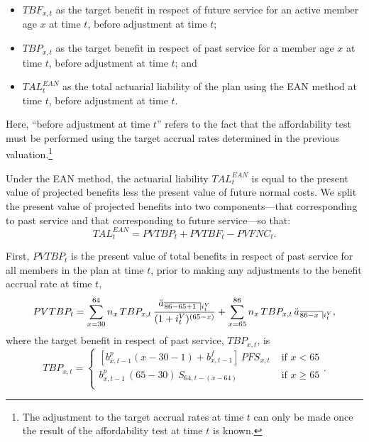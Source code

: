 \documentclass{sfuthesis}
\numberwithin{equation}{chapter}
\begin{document}
		\begin{itemize}
			\item $TBF_{x,t}$ as the target benefit in respect of future service for an active member age $x$ at time $t$, before adjustment at time $t$;
			\item $TBP_{x,t}$ as the target benefit in respect of past service for a member age $x$ at time $t$, before adjustment at time $t$; and
			\item $TAL_{t}^{EAN}$ as the total actuarial liability of the plan using the EAN method at time $t$, before adjustment at time $t$.
		\end{itemize}
		Here, ``before adjustment at time $t$'' refers to the fact that the affordability test must be performed using the target accrual rates determined in the previous valuation.\footnote{The adjustment to the target accrual rates at time $t$ can only be made once the result of the affordability test at time $t$ is known.}
	
	
		\justify
		Under the EAN method, the actuarial liability $TAL_{t}^{EAN}$ is equal to the present value of projected benefits less the present value of future normal costs. We split the present value of projected benefits into two components---that corresponding to past service and that corresponding to future service---so that:
		\begin{equation}
		\label{eq:STBP_21}
		TAL_{t}^{EAN} = PVTBP_{t} + PVTBF_{t} -PVFNC_{t}.
		\end{equation}
	
	
		\justify
		First, $PVTBP_{t}$ is the present value of total benefits in respect of past service for all members in the plan at time $t$, prior to making any adjustments to the benefit accrual rate at time $t$,
		\begin{equation}
		\label{eq:STBP_22}
		PVTBP_{t} = \sum_{x=30}^{64}n_{x} \, TBP_{x,t}\, \frac{\ddot{a}_{\angl{86 - 65+1}i^{V}_{t}}}{(1+i^{V}_{t})^{(65-x)}} + \sum_{x=65}^{86}n_{x}\, TBP_{x,t} \, \ddot{a}_{\angl{86 - x }i^{V}_{t}},
		\end{equation}
		where the target benefit in respect of past service, $TBP_{x,t}$, is
		\begin{equation}
		\label{eq:STBP_23}
		TBP_{x,t} = \left\{
		\begin{array}{ll}
		\left[b_{x, t-1}^{p} (x-30-1) + b_{x, t-1}^{f}\right] \, PFS_{x,t} &\text{ if }x<65\\
		b_{x, t-1}^{p}  \, (65-30) \, S_{64,t-(x-64)} &\text{ if }x\geqslant 65\\
		\end{array}
		\right..
		\end{equation}
	
\end{document}
